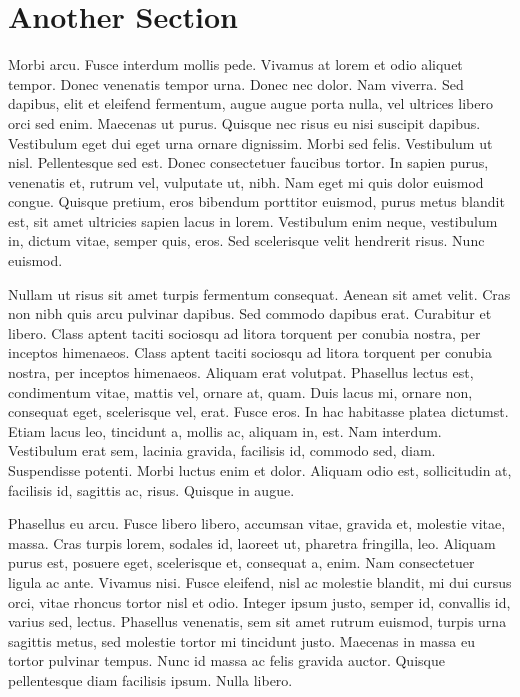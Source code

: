 \section{Another Section}
Morbi arcu. Fusce interdum mollis pede. Vivamus at lorem et odio aliquet tempor. Donec venenatis tempor urna. Donec nec dolor. Nam viverra. Sed dapibus, elit et eleifend fermentum, augue augue porta nulla, vel ultrices libero orci sed enim. Maecenas ut purus. Quisque nec risus eu nisi suscipit dapibus. Vestibulum eget dui eget urna ornare dignissim. Morbi sed felis. Vestibulum ut nisl. Pellentesque sed est. Donec consectetuer faucibus tortor. In sapien purus, venenatis et, rutrum vel, vulputate ut, nibh. Nam eget mi quis dolor euismod congue. Quisque pretium, eros bibendum porttitor euismod, purus metus blandit est, sit amet ultricies sapien lacus in lorem. Vestibulum enim neque, vestibulum in, dictum vitae, semper quis, eros. Sed scelerisque velit hendrerit risus. Nunc euismod.

Nullam ut risus sit amet turpis fermentum consequat. Aenean sit amet velit. Cras non nibh quis arcu pulvinar dapibus. Sed commodo dapibus erat. Curabitur et libero. Class aptent taciti sociosqu ad litora torquent per conubia nostra, per inceptos himenaeos. Class aptent taciti sociosqu ad litora torquent per conubia nostra, per inceptos himenaeos. Aliquam erat volutpat. Phasellus lectus est, condimentum vitae, mattis vel, ornare at, quam. Duis lacus mi, ornare non, consequat eget, scelerisque vel, erat. Fusce eros. In hac habitasse platea dictumst. Etiam lacus leo, tincidunt a, mollis ac, aliquam in, est. Nam interdum. Vestibulum erat sem, lacinia gravida, facilisis id, commodo sed, diam. Suspendisse potenti. Morbi luctus enim et dolor. Aliquam odio est, sollicitudin at, facilisis id, sagittis ac, risus. Quisque in augue.

Phasellus eu arcu. Fusce libero libero, accumsan vitae, gravida et, molestie vitae, massa. Cras turpis lorem, sodales id, laoreet ut, pharetra fringilla, leo. Aliquam purus est, posuere eget, scelerisque et, consequat a, enim. Nam consectetuer ligula ac ante. Vivamus nisi. Fusce eleifend, nisl ac molestie blandit, mi dui cursus orci, vitae rhoncus tortor nisl et odio. Integer ipsum justo, semper id, convallis id, varius sed, lectus. Phasellus venenatis, sem sit amet rutrum euismod, turpis urna sagittis metus, sed molestie tortor mi tincidunt justo. Maecenas in massa eu tortor pulvinar tempus. Nunc id massa ac felis gravida auctor. Quisque pellentesque diam facilisis ipsum. Nulla libero.

